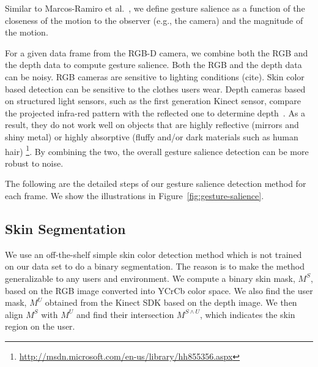 \documentclass{sigchi}
\begin{document}
Similar to Marcos-Ramiro et al.~\cite{marcos2013}, we define gesture salience as a function of 
the closeness of the motion to the observer (e.g., the camera) and the magnitude of the motion.

For a given data frame from the RGB-D camera, we combine both the RGB and the depth data to 
compute gesture salience. Both the RGB and the depth data can be noisy. RGB cameras are sensitive to lighting conditions (cite).
Skin color based detection can be sensitive to the clothes users wear. Depth cameras based on 
structured light sensors, such as the first generation Kinect sensor, compare the projected infra-red pattern
with the reflected one to determine depth~\cite{welsh:2011}. As a result, they do not work well on 
objects that are highly reflective (mirrors and shiny metal) or highly absorptive (fluffy and/or dark materials such as human hair)
\footnote{\url{http://msdn.microsoft.com/en-us/library/hh855356.aspx}}. By combining the two,
the overall gesture salience detection can be more robust to noise.

The following are the detailed steps of our gesture salience detection method for each frame. 
We show the illustrations in Figure~\ref{fig:gesture-salience}. 

\subsection{Skin Segmentation}
We use an off-the-shelf simple skin color detection method which is not trained on our data set to do a binary segmentation. The reason is
to make the method generalizable to any users and environment. We compute a binary skin mask, $M^S$, based on the RGB image converted into YCrCb
color space.  We also find the user mask, $M^U$ obtained from the Kinect SDK based on the depth image. 
We then align $M^S$ with $M^U$ and find their intersection $M^{S\wedge U}$, which indicates the skin region on the user.
\end{document}
